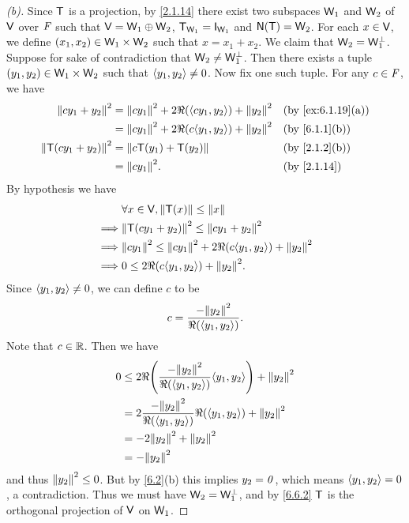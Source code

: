 \begin{proof}[(b)]
  Since \(\mathsf{T}\) is a projection, by \cref{2.1.14} there exist two subspaces \(\mathsf{W}_1\) and \(\mathsf{W}_2\) of \(\mathsf{V}\) over \(\mathit{F}\) such that \(\mathsf{V} = \mathsf{W}_1 \oplus \mathsf{W}_2\), \(\T_{\W_1} = \IT[\W_1]\) and \(\ns{\T} = \W_2\).
  For each \(x \in \mathsf{V}\), we define \((x_1, x_2) \in \mathsf{W}_1 \times \mathsf{W}_2\) such that \(x = x_1 + x_2\).
  We claim that \(\mathsf{W}_2 = \mathsf{W}_1^{\perp}\).
  Suppose for sake of contradiction that \(\mathsf{W}_2 \neq \mathsf{W}_1^{\perp}\).
  Then there exists a tuple \((y_1, y_2) \in \mathsf{W}_1 \times \mathsf{W}_2\) such that \(\left\langle y_1, y_2\right\rangle \neq 0\).
  Now fix one such tuple.
  For any \(c \in \mathit{F}\), we have
  \begin{align*}
    \norm{c y_1 + y_2}^2     & = \norm{c y_1}^2 + 2 \Re(\inn{c y_1, y_2}) + \norm{y_2}^2 &  & \by{ex:6.1.19}[a] \\
                             & = \norm{c y_1}^2 + 2 \Re(c \inn{y_1, y_2}) + \norm{y_2}^2 &  & \by{6.1.1}[b]     \\
    \norm{\T(c y_1 + y_2)}^2 & = \norm{c \T(y_1) + \T(y_2)}                              &  & \by{2.1.2}[b]     \\
                             & = \norm{c y_1}^2.                                         &  & \by{2.1.14}
  \end{align*}
  By hypothesis we have
  \begin{align*}
             & \forall x \in \V, \norm{\T(x)} \leq \norm{x}                                \\
    \implies & \norm{\T(c y_1 + y_2)}^2 \leq \norm{c y_1 + y_2}^2                          \\
    \implies & \norm{c y_1}^2 \leq \norm{c y_1}^2 + 2 \Re(c \inn{y_1, y_2}) + \norm{y_2}^2 \\
    \implies & 0 \leq 2 \Re(c \inn{y_1, y_2}) + \norm{y_2}^2.
  \end{align*}
  Since \(\left\langle y_1, y_2\right\rangle \neq 0\), we can define \(c\) to be
  \[
    c = \frac{-\norm{y_2}^2}{\Re(\inn{y_1, y_2})}.
  \]
  Note that \(c \in \mathbb{R}\).
  Then we have
  \begin{align*}
    0 & \leq 2 \Re\pa{\frac{-\norm{y_2}^2}{\Re(\inn{y_1, y_2})} \inn{y_1, y_2}} + \norm{y_2}^2 \\
      & = 2 \frac{-\norm{y_2}^2}{\Re(\inn{y_1, y_2})} \Re\pa{\inn{y_1, y_2}} + \norm{y_2}^2    \\
      & = - 2 \norm{y_2}^2 + \norm{y_2}^2                                                      \\
      & = - \norm{y_2}^2
  \end{align*}
  and thus \(\left\lVert y_2\right\rVert^2 \leq 0\).
  But by \cref{6.2}(b) this implies \(y_2 = \mathit{0}\), which means \(\left\langle y_1, y_2\right\rangle = 0\), a contradiction.
  Thus we must have \(\mathsf{W}_2 = \mathsf{W}_1^{\perp}\), and by \cref{6.6.2} \(\mathsf{T}\) is the orthogonal projection of \(\mathsf{V}\) on \(\mathsf{W}_1\).
\end{proof}

